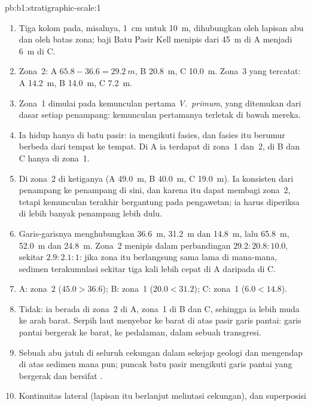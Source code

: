 \begin{solution}{pb:b1:stratigraphic-scale:1}
\begin{enumerate}
  \item Tiga kolom pada, misalnya, \qty{1}{cm} untuk \qty{10}{m}, dihubungkan oleh lapisan
        abu dan oleh batas zona; baji Batu Pasir Kell menipis dari \qty{45}{m} di A menjadi
        \qty{6}{m} di C.
  \item Zona~2: A $65.8 - 36.6 = \qty{29.2}{m}$, B \qty{20.8}{m}, C
        \qty{10.0}{m}. Zona~3 yang tercatat: A \qty{14.2}{m}, B \qty{14.0}{m}, C
        \qty{7.2}{m}.
  \item Zona~1 dimulai pada kemunculan pertama \emph{V.~primum}, yang ditemukan dari dasar
        setiap penampang: kemunculan pertamanya terletak di bawah mereka.
  \item Ia hidup hanya di batu pasir: ia mengikuti fasies, dan fasies itu berumur berbeda
        dari tempat ke tempat. Di A ia terdapat di zona~1 dan~2, di B dan C hanya di zona~1.
  \item Di zona~2 di ketiganya (A \qty{49.0}{m}, B \qty{40.0}{m}, C
        \qty{19.0}{m}). Ia konsisten dari penampang ke penampang di sini, dan karena itu dapat
        membagi zona~2, tetapi kemunculan terakhir bergantung pada pengawetan; ia harus
        diperiksa di lebih banyak penampang lebih dulu.
  \item Garis-garisnya menghubungkan \qty{36.6}{m}, \qty{31.2}{m} dan \qty{14.8}{m}, lalu
        \qty{65.8}{m}, \qty{52.0}{m} dan \qty{24.8}{m}. Zona~2 menipis dalam perbandingan
        $29.2 : 20.8 : 10.0$, sekitar $2.9 : 2.1 : 1$: jika zona itu berlangsung sama lama di
        mana-mana, sedimen terakumulasi sekitar tiga kali lebih cepat di A daripada di C.
  \item A: zona~2 ($45.0 > 36.6$); B: zona~1 ($20.0 < 31.2$); C: zona~1
        ($6.0 < 14.8$).
  \item Tidak: ia berada di zona~2 di A, zona~1 di B dan C, sehingga ia lebih muda ke arah
        barat. Serpih laut menyebar ke barat di atas pasir garis pantai: garis pantai bergerak
        ke barat, ke pedalaman, dalam sebuah transgresi.
  \item Sebuah abu jatuh di seluruh cekungan dalam sekejap geologi dan mengendap di atas
        sedimen mana pun; puncak batu pasir mengikuti garis pantai yang bergerak dan bersifat
        .
  \item Kontinuitas lateral (lapisan itu berlanjut melintasi cekungan), dan superposisi

\end{enumerate}
\end{solution}
